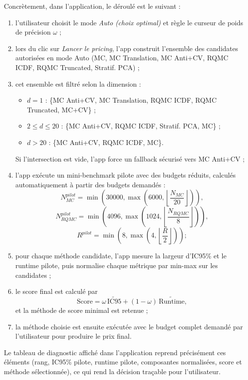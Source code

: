 ﻿\documentclass[11pt,a4paper]{article}
\begin{document}
Concrètement, dans l'application, le déroulé est le suivant :
\begin{enumerate}
    \item l'utilisateur choisit le mode \textit{Auto (choix optimal)} et règle le curseur de poids de précision $\omega$ ;
    \item lors du clic sur \textit{Lancer le pricing}, l'app construit l'ensemble des candidates autorisées en mode Auto (MC, MC Translation, MC Anti+CV, RQMC ICDF, RQMC Truncated, Stratif. PCA) ;
    \item cet ensemble est filtré selon la dimension :
    \begin{itemize}
        \item $d=1$ : \{MC Anti+CV, MC Translation, RQMC ICDF, RQMC Truncated, MC+CV\} ;
        \item $2\le d\le 20$ : \{MC Anti+CV, RQMC ICDF, Stratif. PCA, MC\} ;
        \item $d>20$ : \{MC Anti+CV, RQMC ICDF, MC\}.
    \end{itemize}
    Si l'intersection est vide, l'app force un fallback sécurisé vers MC Anti+CV ;
    \item l'app exécute un mini-benchmark pilote avec des budgets réduits, calculés automatiquement à partir des budgets demandés :
    \[
    N_{MC}^{pilot}=\min\!\left(30000,\max\!\left(6000,\left\lfloor\frac{N_{MC}}{20}\right\rfloor\right)\right),
    \]
    \[
    N_{RQMC}^{pilot}=\min\!\left(4096,\max\!\left(1024,\left\lfloor\frac{N_{RQMC}}{8}\right\rfloor\right)\right),
    \]
    \[
    R^{pilot}=\min\!\left(8,\max\!\left(4,\left\lfloor\frac{R}{2}\right\rfloor\right)\right);
    \]
    \item pour chaque méthode candidate, l'app mesure la largeur d'IC95\% et le runtime pilote, puis normalise chaque métrique par min-max sur les candidates ;
    \item le score final est calculé par
    \[
    \mathrm{Score}=\omega\,\widetilde{\mathrm{IC95}}+(1-\omega)\,\widetilde{\mathrm{Runtime}},
    \]
    et la méthode de score minimal est retenue ;
    \item la méthode choisie est ensuite exécutée avec le budget complet demandé par l'utilisateur pour produire le prix final.
\end{enumerate}

Le tableau de diagnostic affiché dans l'application reprend précisément ces éléments (rang, IC95\% pilote, runtime pilote, composantes normalisées, score et méthode sélectionnée), ce qui rend la décision traçable pour l'utilisateur.
\end{document}
